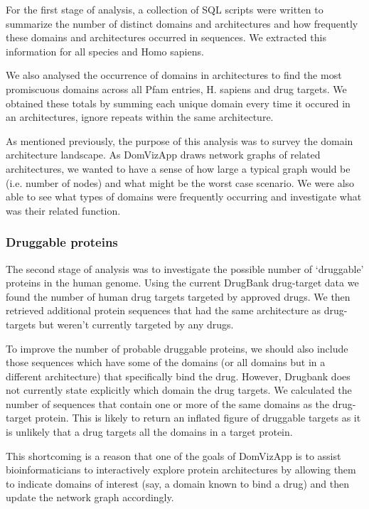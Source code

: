For the first stage of analysis, a collection of SQL scripts were written to summarize the number of distinct domains and architectures and how frequently these domains and architectures occurred in sequences. We extracted this information for all species and Homo sapiens.

We also analysed the occurrence of domains in architectures to find the most promiscuous domains across all Pfam entries, H. sapiens and drug targets. We obtained these totals by summing each unique domain every time it occured in an architectures, ignore repeats within the same architecture.

As mentioned previously, the purpose of this analysis was to survey the domain architecture landscape. As DomVizApp draws network graphs of related architectures, we wanted to have a sense of how large a typical graph would be (i.e. number of nodes) and what might be the worst case scenario. We were also able to see what types of domains were frequently occurring and investigate what was their related function.

\subsubsection{Druggable proteins}

The second stage of analysis was to investigate the possible number of `druggable' proteins in the human genome. Using the current DrugBank drug-target data we found the number of human drug targets targeted by approved drugs. We then retrieved additional protein sequences that had the same architecture as drug-targets but weren't currently targeted by any drugs.

To improve the number of probable druggable proteins, we should also include those sequences which have some of the domains (or all domains but in a different architecture) that specifically bind the drug. However, Drugbank does not currently state explicitly which domain the drug targets. We calculated the number of sequences that contain one or more of the same domains as the drug-target protein. This is likely to return an inflated figure of druggable targets as it is unlikely that a drug targets all the domains in a target protein.

This shortcoming is a reason that one of the goals of DomVizApp is to assist bioinformaticians to interactively explore protein architectures by allowing them to indicate domains of interest (say, a domain known to bind a drug) and then update the network graph accordingly.


